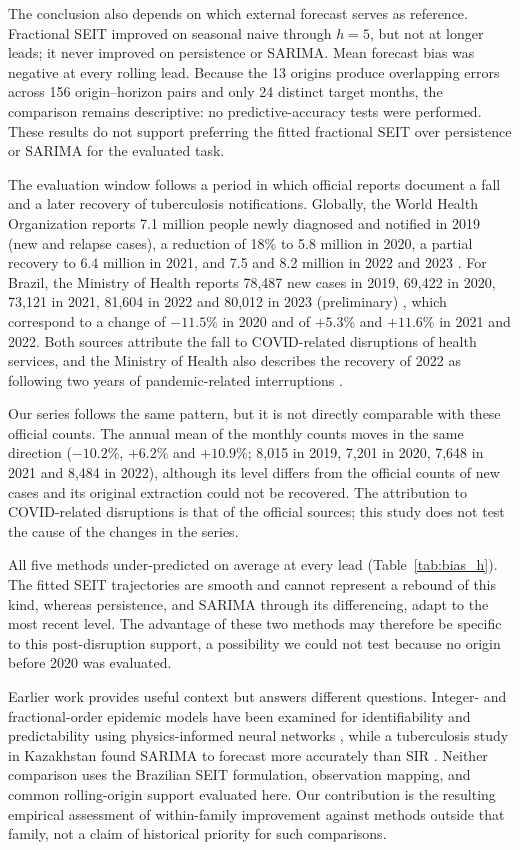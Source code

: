 \documentclass[pdflatex,sn-mathphys-ay]{sn-jnl}
\begin{document}
The conclusion also depends on which external forecast serves as reference. Fractional SEIT improved on seasonal naive through $h=5$, but not at longer leads; it never improved on persistence or SARIMA. Mean forecast bias was negative at every rolling lead. Because the 13 origins produce overlapping errors across 156 origin--horizon pairs and only 24 distinct target months, the comparison remains descriptive: no predictive-accuracy tests were performed. These results do not support preferring the fitted fractional SEIT over persistence or SARIMA for the evaluated task.

The evaluation window follows a period in which official reports document a fall and a later recovery of tuberculosis notifications. Globally, the World Health Organization reports 7.1 million people newly diagnosed and notified in 2019 (new and relapse cases), a reduction of 18\% to 5.8 million in 2020, a partial recovery to 6.4 million in 2021, and 7.5 and 8.2 million in 2022 and 2023 \citep{who2024}. For Brazil, the Ministry of Health reports 78,487 new cases in 2019, 69,422 in 2020, 73,121 in 2021, 81,604 in 2022 and 80,012 in 2023 (preliminary) \citep{moh2024}, which correspond to a change of $-11.5\%$ in 2020 and of $+5.3\%$ and $+11.6\%$ in 2021 and 2022. Both sources attribute the fall to COVID-related disruptions of health services, and the Ministry of Health also describes the recovery of 2022 as following two years of pandemic-related interruptions \citep{who2024,moh2024}.

Our series follows the same pattern, but it is not directly comparable with these official counts. The annual mean of the monthly counts moves in the same direction ($-10.2\%$, $+6.2\%$ and $+10.9\%$; 8,015 in 2019, 7,201 in 2020, 7,648 in 2021 and 8,484 in 2022), although its level differs from the official counts of new cases and its original extraction could not be recovered. The attribution to COVID-related disruptions is that of the official sources; this study does not test the cause of the changes in the series.

All five methods under-predicted on average at every lead (Table~\ref{tab:bias_h}). The fitted SEIT trajectories are smooth and cannot represent a rebound of this kind, whereas persistence, and SARIMA through its differencing, adapt to the most recent level. The advantage of these two methods may therefore be specific to this post-disruption support, a possibility we could not test because no origin before 2020 was evaluated.

Earlier work provides useful context but answers different questions. Integer- and fractional-order epidemic models have been examined for identifiability and predictability using physics-informed neural networks \citep{kharazmi2021}, while a tuberculosis study in Kazakhstan found SARIMA to forecast more accurately than SIR \citep{kalizhanova2024}. Neither comparison uses the Brazilian SEIT formulation, observation mapping, and common rolling-origin support evaluated here. Our contribution is the resulting empirical assessment of within-family improvement against methods outside that family, not a claim of historical priority for such comparisons.
\end{document}
